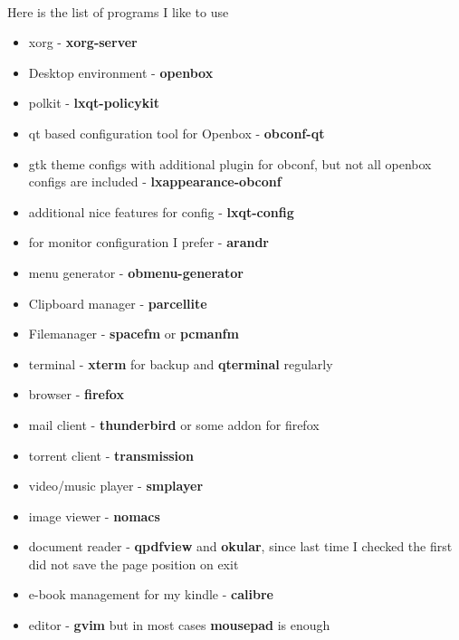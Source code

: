 \documentclass[10pt,a4paper]{article}
\begin{document}
                    \paragraph{} Here is the list of programs I like to use
                    \begin{itemize}
                        \item xorg - \textbf{xorg-server}
                        \item Desktop environment - \textbf{openbox}
                        \item polkit - \textbf{lxqt-policykit}
                        \item qt based configuration tool for Openbox - \textbf{obconf-qt}
                        \item gtk theme configs with additional plugin for obconf, but not all openbox configs are included - \textbf{lxappearance-obconf}
                        \item additional nice features for config - \textbf{lxqt-config}
                        \item for monitor configuration I prefer - \textbf{arandr}
                        \item menu generator - \textbf{obmenu-generator}
                        \item Clipboard manager - \textbf{parcellite}
                        \item Filemanager - \textbf{spacefm} or \textbf{pcmanfm}
                        \item terminal - \textbf{xterm} for backup and \textbf{qterminal} regularly
                        \item browser - \textbf{firefox} 
                        \item mail client - \textbf{thunderbird} or some addon for firefox
                        \item torrent client - \textbf{transmission}
                        \item video/music player - \textbf{smplayer}
                        \item image viewer - \textbf{nomacs}
                        \item document reader - \textbf{qpdfview} and \textbf{okular}, since last time I checked the first did not save the page position on exit
                        \item e-book management for my kindle - \textbf{calibre}
                        \item editor - \textbf{gvim} but in most cases \textbf{mousepad} is enough

\end{itemize}
\end{document}
